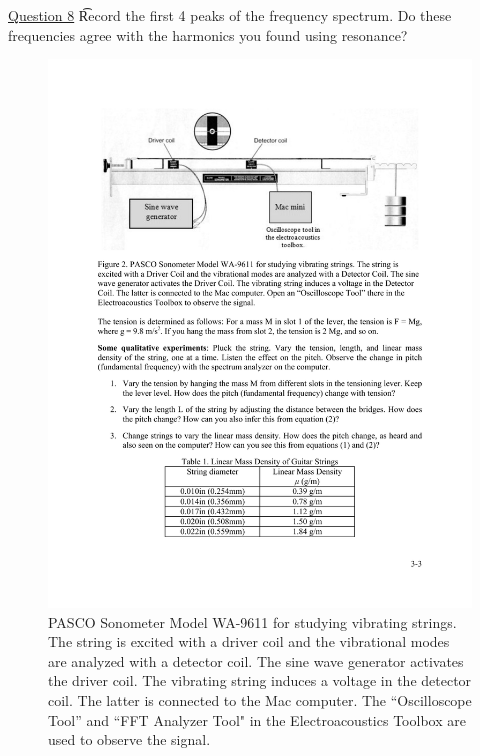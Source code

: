 \documentclass[11pt]{NSF}
\begin{document}
\underline{Question 8} \t Record the first 4 peaks of the frequency spectrum. Do these frequencies agree with the harmonics you found using resonance?
%
\begin{figure}[hbtp] 
\begin{center} 
\includegraphics[width=\textwidth]{fig3_2}
\caption{PASCO Sonometer Model WA-9611 for studying vibrating strings. The
string is excited with a driver coil and the vibrational modes are analyzed
with a detector coil. The sine wave generator activates the driver coil. The
vibrating string induces a voltage in the detector coil. The latter is
connected to the Mac computer. The ``Oscilloscope Tool” and ``FFT Analyzer
Tool" in the Electroacoustics Toolbox are used to observe the signal.}
\label{f:2} 
\end{center} 
\end{figure}
%
%
\end{document}

